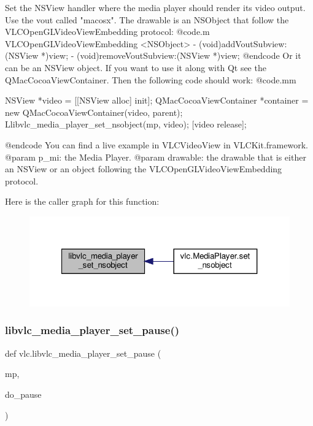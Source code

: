 \begin{DoxyVerb}Set the NSView handler where the media player should render its video output.
Use the vout called "macosx".
The drawable is an NSObject that follow the VLCOpenGLVideoViewEmbedding
protocol:
@code.m
\@protocol VLCOpenGLVideoViewEmbedding <NSObject>
- (void)addVoutSubview:(NSView *)view;
- (void)removeVoutSubview:(NSView *)view;
\@end
@endcode
Or it can be an NSView object.
If you want to use it along with Qt see the QMacCocoaViewContainer. Then
the following code should work:
@code.mm

    NSView *video = [[NSView alloc] init];
    QMacCocoaViewContainer *container = new QMacCocoaViewContainer(video, parent);
    L{libvlc_media_player_set_nsobject}(mp, video);
    [video release];

@endcode
You can find a live example in VLCVideoView in VLCKit.framework.
@param p_mi: the Media Player.
@param drawable: the drawable that is either an NSView or an object following the VLCOpenGLVideoViewEmbedding protocol.
\end{DoxyVerb}
 Here is the caller graph for this function\+:
\nopagebreak
\begin{figure}[H]
\begin{center}
\leavevmode
\includegraphics[width=321pt]{namespacevlc_aaf2252c49a6e14c5fbcab04065b8b6f5_icgraph}
\end{center}
\end{figure}
\mbox{\label{namespacevlc_a4e7da817fafe9c1c27e7b6724bb744b8}} 
\subsubsection{\texorpdfstring{libvlc\+\_\+media\+\_\+player\+\_\+set\+\_\+pause()}{libvlc\_media\_player\_set\_pause()}}
{\footnotesize\ttfamily def vlc.\+libvlc\+\_\+media\+\_\+player\+\_\+set\+\_\+pause (\begin{DoxyParamCaption}\item[{}]{mp,  }\item[{}]{do\+\_\+pause }\end{DoxyParamCaption})}

